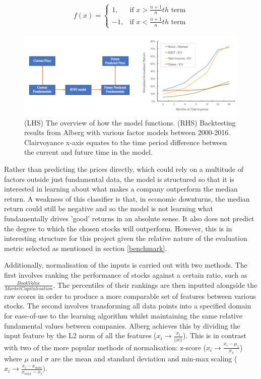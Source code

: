 \documentclass[10pt,onecolumn,letterpaper]{article}
\begin{document}
\[f(x)= 
\begin{cases}
	1,& \text{if } x > \frac{n+1}{n}th\text{ term}\\
    	-1,& \text{if } x < \frac{n+1}{n}th\text{ term}
\end{cases}
\]

\begin{figure}[!hbt!]
\centering
\includegraphics[width=14.5cm]{alberg_intro.png}
\caption{(LHS) The overview of how the model functions. (RHS) Backtesting results from Alberg with various factor models between 2000-2016. Clairvoyance x-axis equates to the time period difference between the current and future time in the model. }
\end{figure}

Rather than predicting the prices directly, which could rely on a multitude of factors outside just fundamental data, the model is structured so that it is interested in learning about what makes a company outperform the median return. A weakness of this classifier is that, in economic downturns, the median return could still be negative and so the model is not learning what fundamentally drives 'good' returns in an absolute sense. It also does not predict the degree to which the chosen stocks will outperform. However, this is in interesting structure for this project given the relative nature of the evaluation metric selected as mentioned in section \ref{benchmark}.

Additionally, normalisation of the inputs is carried out with two methods. The first involves ranking the performance of stocks against a certain ratio, such as $\frac{Book Value}{Market Capitalisation}$. The percentiles of their rankings are then inputted alongside the raw scores in order to produce a more comparable set of features between various stocks. The second involves transforming all data points into a specified domain for ease-of-use to the learning algorithm whilst maintaining the same relative fundamental values between companies. Alberg achieves this by dividing the input feature by the L2 norm of all the features ($x_{i} \rightarrow \frac{x_{i}}{||x||}$). This is in contrast with two of the more popular methods of normalisation: z-score ($x_{i} \rightarrow \frac{x_{i}-\mu_{x}}{\sigma_{x}}$) where $\mu$ and $\sigma$ are the mean and standard deviation and min-max scaling ($x_{i} \rightarrow \frac{x_{i}-x_{min}}{x_{max}-x_{i}})$.
\end{document}
